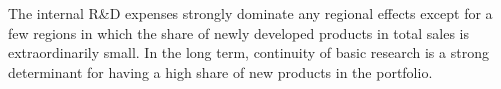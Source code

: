 \label{sec:conclusion}
The internal R\&D expenses strongly dominate any regional effects except for a few regions in which the share of newly developed products in total sales is extraordinarily small. In the long term, continuity of basic research is a strong determinant for having a high share of new products in the portfolio.
